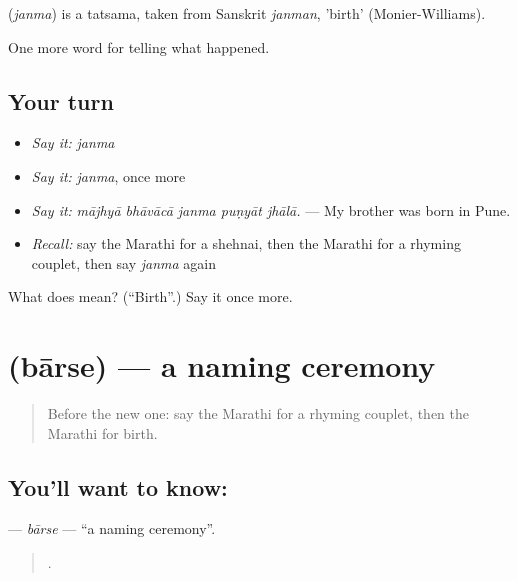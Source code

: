 \begin{cousinweb}
\textbf{} (\emph{janma}) is a tatsama, taken from Sanskrit \emph{janman}, 'birth' (Monier-Williams).
\end{cousinweb}

\begin{grammarlens}[title={What you've built}]
One more word for telling what happened.
\end{grammarlens}

\subsection*{Your turn}
\begin{itemize}
\raggedright
  \item \emph{Say it:} \emph{janma}
  \item \emph{Say it:} \emph{janma}, once more
  \item \emph{Say it:} \emph{mājhyā bhāvācā janma puṇyāt jhālā.} — My brother was born in Pune.
  \item \emph{Recall:} say the Marathi for a shehnai, then the Marathi for a rhyming couplet, then say \emph{janma} again
\end{itemize}

\begin{tcolorbox}[breakable,colback=teal!4,colframe=teal!35!black,title={Before you move on}]
What does  mean? (\textquotedblleft{}Birth\textquotedblright{}.) Say it once more.
\end{tcolorbox}
\section[\texorpdfstring{\mr{बारसे} (bārse)}{बारसे (bārse)}]{ (bārse) — a naming ceremony}

\label{lesson:MR-C318-barse}



\begin{quote}
Before the new one: say the Marathi for a rhyming couplet, then the Marathi for birth.
\end{quote}

\subsection*{You'll want to know: }
\textbf{} — \emph{bārse} — \textquotedblleft{}a naming ceremony\textquotedblright{}.

\begin{quote}
    .
\end{quote}

